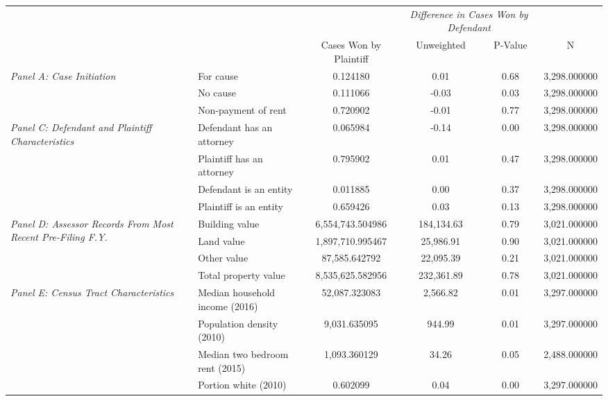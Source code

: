 \begin{tabular}{llcccc}
\toprule
 &  & \textit{} & \multicolumn{2}{|c|}{\textit{Difference in Cases Won by Defendant}} & \textit{} \\
 &  & Cases Won by Plaintiff & Unweighted & P-Value & N \\
\midrule
\multirow[c]{3}{4cm}{\textit{Panel A: Case Initiation}} & For cause & 0.124180 & 0.01 & 0.68 & 3,298.000000 \\
 & No cause & 0.111066 & -0.03 & 0.03 & 3,298.000000 \\
 & Non-payment of rent & 0.720902 & -0.01 & 0.77 & 3,298.000000 \\
\cline{1-6}
\multirow[c]{4}{4cm}{\textit{Panel C: Defendant and Plaintiff Characteristics}} & Defendant has an attorney & 0.065984 & -0.14 & 0.00 & 3,298.000000 \\
 & Plaintiff has an attorney & 0.795902 & 0.01 & 0.47 & 3,298.000000 \\
 & Defendant is an entity & 0.011885 & 0.00 & 0.37 & 3,298.000000 \\
 & Plaintiff is an entity & 0.659426 & 0.03 & 0.13 & 3,298.000000 \\
\cline{1-6}
\multirow[c]{4}{4cm}{\textit{Panel D: Assessor Records From Most Recent Pre-Filing F.Y.}} & Building value & 6,554,743.504986 & 184,134.63 & 0.79 & 3,021.000000 \\
 & Land value & 1,897,710.995467 & 25,986.91 & 0.90 & 3,021.000000 \\
 & Other value & 87,585.642792 & 22,095.39 & 0.21 & 3,021.000000 \\
 & Total property value & 8,535,625.582956 & 232,361.89 & 0.78 & 3,021.000000 \\
\cline{1-6}
\multirow[c]{4}{4cm}{\textit{Panel E: Census Tract Characteristics}} & Median household income (2016) & 52,087.323083 & 2,566.82 & 0.01 & 3,297.000000 \\
 & Population density (2010) & 9,031.635095 & 944.99 & 0.01 & 3,297.000000 \\
 & Median two bedroom rent (2015) & 1,093.360129 & 34.26 & 0.05 & 2,488.000000 \\
 & Portion white (2010) & 0.602099 & 0.04 & 0.00 & 3,297.000000 \\
\cline{1-6}
\bottomrule
\end{tabular}
